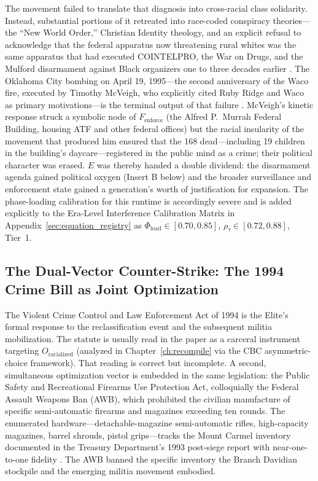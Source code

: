 The movement failed to translate that diagnosis into cross-racial class solidarity. Instead, substantial portions of it retreated into race-coded conspiracy theories---the ``New World Order,'' Christian Identity theology, and an explicit refusal to acknowledge that the federal apparatus now threatening rural whites was the same apparatus that had executed COINTELPRO, the War on Drugs, and the Mulford disarmament against Black organizers one to three decades earlier \cite{pitcavage2001, splc_patriot_timeline}. The Oklahoma City bombing on April 19, 1995---the second anniversary of the Waco fire, executed by Timothy McVeigh, who explicitly cited Ruby Ridge and Waco as primary motivations---is the terminal output of that failure \cite{wright_mcveigh, splc_patriot_timeline}. McVeigh's kinetic response struck a symbolic node of $F_{\text{enforce}}$ (the Alfred P.\ Murrah Federal Building, housing ATF and other federal offices) but the racial insularity of the movement that produced him ensured that the 168 dead---including 19 children in the building's daycare---registered in the public mind as a crime; their political character was erased. $E$ was thereby handed a double dividend: the disarmament agenda gained political oxygen (Insert B below) and the broader surveillance and enforcement state gained a generation's worth of justification for expansion. The phase-loading calibration for this runtime is accordingly severe and is added explicitly to the Era-Level Interference Calibration Matrix in Appendix~\ref{sec:equation_registry} as $\Phi_{\text{load}} \in [0.70, 0.85]$, $\rho_\tau \in [0.72, 0.88]$, Tier~1.

\subsection{The Dual-Vector Counter-Strike: The 1994 Crime Bill as Joint Optimization}
\label{subsec:dual_vector_1994}

The Violent Crime Control and Law Enforcement Act of 1994 is the Elite's formal response to the reclassification event and the subsequent militia mobilization. The statute is usually read in the paper as a carceral instrument targeting $O_{\text{racialized}}$ (analyzed in Chapter~\ref{ch:recompile} via the CBC asymmetric-choice framework). That reading is correct but incomplete. A second, simultaneous optimization vector is embedded in the same legislation: the Public Safety and Recreational Firearms Use Protection Act, colloquially the Federal Assault Weapons Ban (AWB), which prohibited the civilian manufacture of specific semi-automatic firearms and magazines exceeding ten rounds. The enumerated hardware---detachable-magazine semi-automatic rifles, high-capacity magazines, barrel shrouds, pistol grips---tracks the Mount Carmel inventory documented in the Treasury Department's 1993 post-siege report with near-one-to-one fidelity \cite{treasury1993waco}. The AWB banned the specific inventory the Branch Davidian stockpile and the emerging militia movement embodied.

